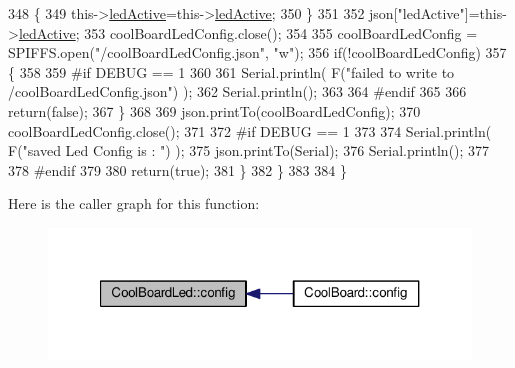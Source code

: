 \begin{DoxyCode}
348             \{
349                 this->\hyperlink{class_cool_board_led_aadd04d2ecf123247718d77f42fba7f08}{ledActive}=this->\hyperlink{class_cool_board_led_aadd04d2ecf123247718d77f42fba7f08}{ledActive};          
350             \}
351             
352             json[\textcolor{stringliteral}{"ledActive"}]=this->\hyperlink{class_cool_board_led_aadd04d2ecf123247718d77f42fba7f08}{ledActive};
353             coolBoardLedConfig.close();
354             
355             coolBoardLedConfig = SPIFFS.open(\textcolor{stringliteral}{"/coolBoardLedConfig.json"}, \textcolor{stringliteral}{"w"});
356             \textcolor{keywordflow}{if}(!coolBoardLedConfig)
357             \{
358             
359 \textcolor{preprocessor}{            #if DEBUG == 1 }
360 
361                 Serial.println( F(\textcolor{stringliteral}{"failed to write to /coolBoardLedConfig.json"}) );
362                 Serial.println();
363 
364 \textcolor{preprocessor}{            #endif}
365 
366                 \textcolor{keywordflow}{return}(\textcolor{keyword}{false});          
367             \}
368 
369             json.printTo(coolBoardLedConfig);
370             coolBoardLedConfig.close();
371 
372 \textcolor{preprocessor}{        #if DEBUG == 1}
373     
374             Serial.println( F(\textcolor{stringliteral}{"saved Led Config is : "}) );
375             json.printTo(Serial);
376             Serial.println();
377 
378 \textcolor{preprocessor}{        #endif}
379 
380             \textcolor{keywordflow}{return}(\textcolor{keyword}{true}); 
381         \}
382     \}   
383 
384 \}               
\end{DoxyCode}
Here is the caller graph for this function\+:\nopagebreak
\begin{figure}[H]
\begin{center}
\leavevmode
\includegraphics[width=321pt]{de/dc0/class_cool_board_led_a1b60e5e30bea96c49ed62ed1bf1ffc8b_icgraph}
\end{center}
\end{figure}
\mbox{\label{class_cool_board_led_a69f323359e0c9f797422f2152b5d41ef}} 
